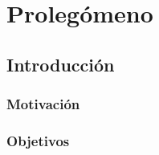 


\part{Prolegómeno} 

\chapter{Introducción}
\thispagestyle{fancy}

\section{Motivación}
\lorem{} %

\section{Objetivos}
\lorem{} %
\newpage

